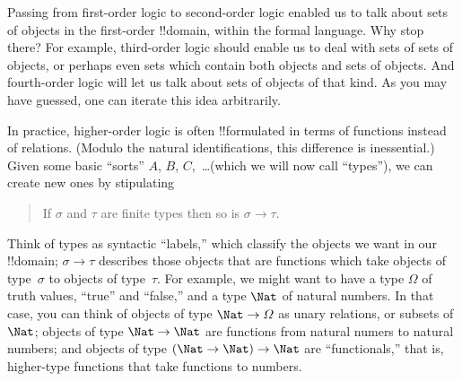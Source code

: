 \documentclass[../../include/open-logic-section]{subfiles}
\begin{document}


Passing from first-order logic to second-order logic enabled us to
talk about sets of objects in the first-order !!{domain}, within the
formal language. Why stop there? For example, third-order logic should
enable us to deal with sets of sets of objects, or perhaps even sets
which contain both objects and sets of objects. And fourth-order logic
will let us talk about sets of objects of that kind. As you may have
guessed, one can iterate this idea arbitrarily.

In practice, higher-order logic is often !!{formula}ted in terms of
functions instead of relations. (Modulo the natural identifications,
this difference is inessential.) Given some basic ``sorts'' $A$, $B$,
$C$,~\dots (which we will now call ``types''), we can create new ones
by stipulating
\begin{quote}
If $\sigma$ and $\tau$ are finite types then so is $\sigma \to \tau$.
\end{quote}
Think of types as syntactic ``labels,'' which classify the objects we
want in our !!{domain}; $\sigma \to \tau$ describes those objects that
are functions which take objects of type~$\sigma$ to objects of
type~$\tau$. For example, we might want to have a type $\Omega$ of
truth values, ``true'' and ``false,'' and a type $\Nat$ of natural
numbers. In that case, you can think of objects of type $\Nat \to
\Omega$ as unary relations, or subsets of $\Nat$; objects of type
$\Nat \to \Nat$ are functions from natural numers to natural numbers;
and objects of type $(\Nat \to \Nat) \to \Nat$ are ``functionals,''
that is, higher-type functions that take functions to numbers.
\end{document}

